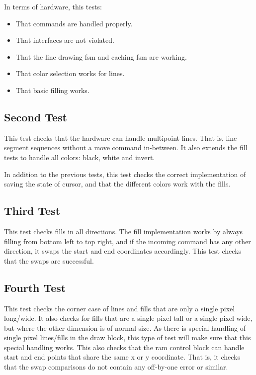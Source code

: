\documentclass[]{article}
\begin{document}
In terms of hardware, this tests:
\begin{itemize}
	\item That commands are handled properly.
	\item That interfaces are not violated.
	\item That the line drawing fsm and caching fsm are working.
	\item That color selection works for lines.
	\item That basic filling works.
\end{itemize}


\subsection{Second Test} %
\label{sub:second_test}
This test checks that the hardware can handle multipoint lines. That is, line segment sequences without a move command in-between. It also extends the fill tests to handle all colors: black, white and invert.

In addition to the previous tests, this test checks the correct implementation of saving the state of cursor, and that the different colors work with the fills.


\subsection{Third Test} %
\label{sub:third_test}

This test checks fills in all directions. The fill implementation works by always filling from bottom left to top right, and if the incoming command has any other direction, it swaps the start and end coordinates accordingly. This test checks that the swaps are successful.


\subsection{Fourth Test} %
\label{sub:fourth_test}

This test checks the corner case of lines and fills that are only a single pixel long/wide. It also checks for fills that are a single pixel tall or a single pixel wide, but where the other dimension is of normal size. As there is special handling of single pixel lines/fills in the draw block, this type of test will make sure that this special handling works. This also checks that the ram control block can handle start and end points that share the same x or y coordinate. That is, it checks that the swap comparisons do not contain any off-by-one error or similar.
\end{document}
